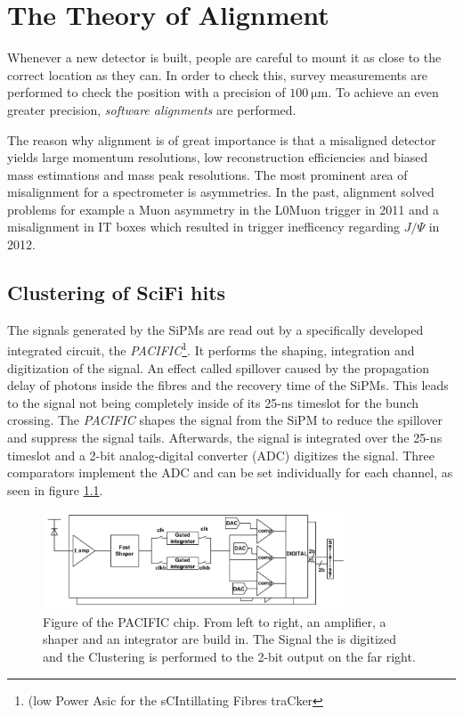 \chapter{The Theory of Alignment}
\label{sec:alignTheory}

Whenever a new detector is built, people are careful to mount it as close to the correct location as they can. In order to check this, survey measurements are
performed to check the position with a precision of $\SI{100}{\micro\metre}$.
To achieve an even greater precision, \textit{software alignments} are performed.

The reason why alignment is of great importance is that a misaligned detector
yields large momentum resolutions, low reconstruction efficiencies and biased mass estimations and mass peak resolutions.
The most prominent area of misalignment for a spectrometer is asymmetries.
In the past, alignment solved problems for example a Muon asymmetry in the
L0Muon trigger in 2011 and a misalignment in IT boxes which resulted in trigger inefficency regarding $J/\Psi$ in 2012.

\section{Clustering of SciFi hits}
\label{sec:clustering}

The signals generated by the SiPMs are read out by a specifically developed integrated circuit, the \textit{PACIFIC}\footnote{(low Power Asic for the sCIntillating Fibres traCker}\cite{readout}.
It performs the shaping, integration and digitization of the signal. An effect called spillover caused by the propagation delay of photons inside the fibres and the recovery time of the SiPMs. This leads to the signal not being completely inside of its 25-ns timeslot for the bunch crossing. The \textit{PACIFIC} shapes the signal from the SiPM to reduce the spillover and suppress the signal tails\cite{techreport}. Afterwards, the signal is integrated over the 25-ns timeslot and a 2-bit analog-digital converter (ADC) digitizes the signal.
Three comparators implement the ADC and can be set individually for each channel, as seen in figure \ref{fig:pac}.

\begin{figure}
    \centering
    \includegraphics[width=0.8\textwidth]{plots/pacific.png}
    \caption{Figure of the PACIFIC chip. From left to right, an amplifier, a shaper and an integrator are build in. The Signal the is digitized and the Clustering is performed to the 2-bit output on the far right.}
    \label{fig:pac}
\end{figure}

